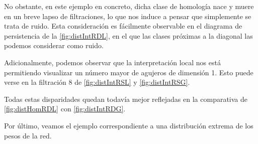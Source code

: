 \documentclass[12pt, a4paper, twoside]{book}
\numberwithin{equation}{section}
\theoremstyle{definition}
\newenvironment{ejem}
  {\pushQED{\qed}\renewcommand{\qedsymbol}{$\blacktriangleleft$}\ejemplo}
  {\popQED\endejemplo}
\theoremstyle{remark}
\theoremstyle{plain}
\begin{document}
\begin{ejem}
	No obstante, en este ejemplo en concreto, dicha clase de homología 
	nace y muere en un breve lapso de filtraciones, lo que nos induce a 
	pensar que simplemente se trata de ruido. Esta consideración es 
	fácilmente observable en el diagrama de persistencia de la 
	\autoref{fig:distIntRDL}, en el que las clases próximas a la diagonal 
	las podemos considerar como ruido.

	Adicionalmente, podemos observar que la interpretación local nos está 
	permitiendo visualizar un número mayor de agujeros de dimensión 1. 
	Esto puede verse en la filtración 8 de \autoref{fig:distIntRSL} y 
	\autoref{fig:distIntRSG}.

	Todas estas disparidades quedan todavía mejor reflejadas en la 
	comparativa de \autoref{fig:distHomRDL} con \autoref{fig:distIntRDG}.
	\end{ejem}

	Por último, veamos el ejemplo correspondiente a una distribución 
	extrema de los pesos de la red.
\end{document}
